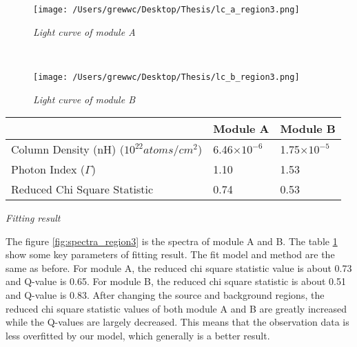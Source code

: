 \documentclass[12pt]{report}
\newcommand{\mycaption}[1]{\caption{\textit{\footnotesize #1}}}
\begin{document}
        \begin{figure}[!ht]  
          \begin{minipage}{1\textwidth}
            \begin{center} 
                \texttt{[image: /Users/grewwc/Desktop/Thesis/lc\_a\_region3.png]}
                \mycaption{Light curve of module A}
                \label{fig:a_1_region3_lightcurve}
            \end{center}
            \end{minipage}
            \\
          \begin{minipage}{1\textwidth}
            \begin{center}
            \texttt{[image: /Users/grewwc/Desktop/Thesis/lc\_b\_region3.png]}
            \mycaption{Light curve of module B}
            \label{fig:b_1_region3_lightcurve}
            \end{center}
          \end{minipage}
          \centering
        \end{figure}
        \begin{table}[!h]   
          \centering
          \begin{tabular}{| m{4cm} | m{3cm} | m{3cm} |}
            \hline
            & Module A & Module B \\
            \hline
            Column Density (nH) ($10^{22} atoms/cm^2$) & 6.46$\times10^{-6}$ & 1.75$\times10^{-5}$\\ 
            \hline
            Photon Index ($\Gamma$) & 1.10 & 1.53 \\
            \hline 
            Reduced Chi Square Statistic & 0.74 & 0.53 \\
            \hline 
          \end{tabular}
          \mycaption{Fitting result}
          \label{table:parameter_region3}
        \end{table}
        
        \indent The figure \ref{fig:spectra_region3} is the spectra of module A and B. The table 
        \ref{table:parameter_region3}
        show some key parameters of fitting result. The fit model and method 
        are the same as before. For module A, the reduced chi square statistic value is about 0.73 and Q-value is 
        0.65. For module B, the reduced chi square statistic is about 0.51 and Q-value is 0.83. After changing the 
        source and background regions, the reduced chi square statistic values of both module A and B are greatly 
        increased while the Q-values are largely decreased. This means that the observation data is less overfitted
        by our model, which generally is a better result.  
\end{document}
